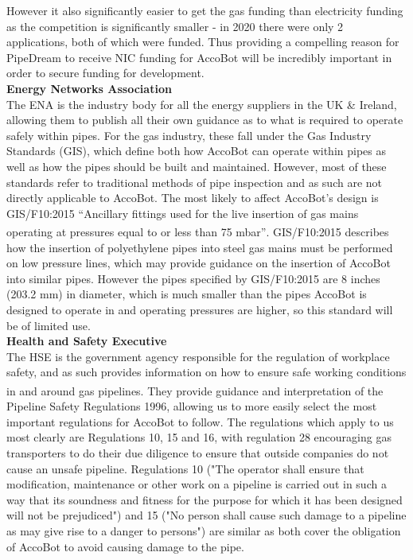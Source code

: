\documentclass[11pt]{article}		%
\newcommand{\supercite}[1]{\textsuperscript{\cite{#1}}}		%
\begin{document}
			However it also significantly easier to get the gas funding than electricity funding as the competition is significantly smaller - in 2020 there were only 2 applications, both of which were funded.
			Thus providing a compelling reason for PipeDream to receive NIC funding for AccoBot will be incredibly important in order to secure funding for development.
			\\
			\textbf{Energy Networks Association}
			\\
			The ENA is the industry body for all the energy suppliers in the UK \& Ireland, allowing them to publish all their own guidance as to what is required to operate safely within pipes.
			For the gas industry, these fall under the Gas Industry Standards (GIS), which define both how AccoBot can operate within pipes as well as how the pipes should be built and maintained.
			However, most of these standards refer to traditional methods of pipe inspection and as such are not directly applicable to AccoBot.
			The most likely to affect AccoBot's design is GIS/F10:2015 “Ancillary fittings used for the live insertion of gas mains operating at pressures equal to or less than 75 mbar”\supercite{energy2015gas}.
			GIS/F10:2015 describes how the insertion of polyethylene pipes into steel gas mains must be performed on low pressure lines, which may provide guidance on the insertion of AccoBot into similar pipes.
			However the pipes specified by 	GIS/F10:2015 are 8 inches (203.2 mm) in diameter, which is much smaller than the pipes AccoBot is designed to operate in and operating pressures are higher, so this standard will be of limited use.
			\\
			\textbf{Health and Safety Executive}
			\\
			The HSE is the government agency responsible for the regulation of workplace safety, and as such provides information on how to ensure safe working conditions in and around gas pipelines.
			They provide guidance and interpretation\supercite{hse1996guide} of the Pipeline Safety Regulations 1996, allowing us to more easily select the most important regulations for AccoBot to follow.
			The regulations which apply to us most clearly are Regulations 10, 15 and 16, with regulation 28 encouraging gas transporters to do their due diligence to ensure that outside companies do not cause an unsafe pipeline.
			Regulations 10 ("The operator shall ensure that modification, maintenance or other work on a pipeline is carried out in such a way that its soundness and fitness for the purpose for which it has been designed will not be prejudiced") and 15 ("No person shall cause such damage to a pipeline as may give rise to a danger to persons") are similar as both cover the obligation of AccoBot to avoid causing damage to the pipe.
\end{document}
